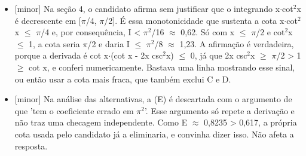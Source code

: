 \documentclass{article}%
\begin{document}
\begin{itemize}%
\item%
{[}minor{]} Na seção 4, o candidato afirma sem justificar que o integrando x$\cdot$cot$^2$x é decrescente em {[}$\pi$/4, $\pi$/2{]}. É essa monotonicidade que sustenta a cota x$\cdot$cot$^2$x $\leq$ $\pi$/4 e, por consequência, I < $\pi$$^2$/16 $\approx$ 0,62. Só com x $\leq$ $\pi$/2 e cot$^2$x $\leq$ 1, a cota seria $\pi$/2 e daria I $\leq$ $\pi$$^2$/8 $\approx$ 1,23. A afirmação é verdadeira, porque a derivada é cot x$\cdot$(cot x - 2x csc$^2$x) $\leq$ 0, já que 2x csc$^2$x $\geq$ $\pi$/2 > 1 $\geq$ cot x, e conferi numericamente. Bastava uma linha mostrando esse sinal, ou então usar a cota mais fraca, que também exclui C e D.%
\item%
{[}minor{]} Na análise das alternativas, a (E) é descartada com o argumento de que 'tem o coeficiente errado em $\pi$$^2$'. Esse argumento só repete a derivação e não traz uma checagem independente. Como E $\approx$ 0,8235 > 0,617, a própria cota usada pelo candidato já a eliminaria, e convinha dizer isso. Não afeta a resposta.%
\end{itemize}%
\end{document}
